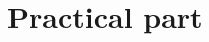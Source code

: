 \documentclass[../thesis.tex]{subfiles}
\begin{document}
\edef\folder{\currfolder /part2}

\part{Practical part}
\label{part:2}


\end{document}
